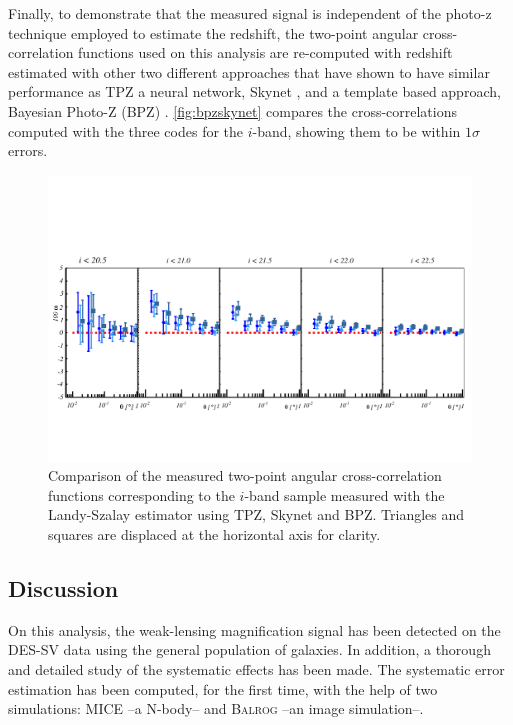     Finally, to demonstrate that the measured signal is independent of the photo-z technique employed to estimate the redshift, the two-point angular cross-correlation functions used on this analysis are re-computed with redshift estimated with other two different approaches that have shown to have similar performance as TPZ \cite{2014MNRAS.445.1482S} a neural network, Skynet  \cite{2014MNRAS.441.1741G}, and a template based approach, Bayesian Photo-Z (BPZ) \cite{2000ApJ...536..571B}. \autoref{fig:bpzskynet} compares the cross-correlations computed with the three codes for the $i$-band, showing them to be within $1\sigma$ errors.
\begin{figure}
\includegraphics[width=\textwidth,trim={0 2.3cm 0 3.5cm},clip]{./figures/mag_i_photoz_comparison.pdf}
\caption{Comparison of the measured two-point angular cross-correlation functions corresponding to the $i$-band sample measured with the Landy-Szalay estimator using TPZ, Skynet and BPZ. Triangles and squares are displaced at the horizontal axis for clarity.}
\label{fig:bpzskynet}
\end{figure}

\subsection{Discussion}
\label{sec:discussion_sv}

On this analysis, the weak-lensing magnification signal has been detected on the DES-SV data using the general population of galaxies. In addition, a thorough and detailed study of the systematic effects has been made. The systematic error estimation has been computed, for the first time, with the help of two simulations: MICE --a N-body-- and {\scshape Balrog} --an image simulation--.
\newline

